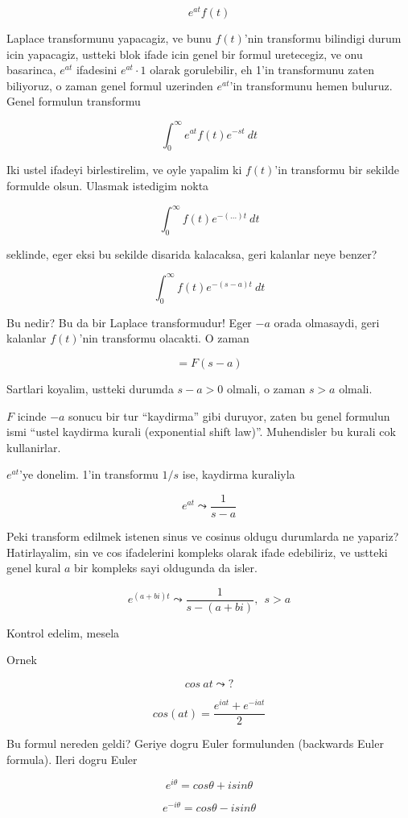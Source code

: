 \documentclass[12pt,fleqn]{article}
\begin{document}
\[ e^{at}f(t) \]

Laplace transformunu yapacagiz, ve bunu $f(t)$'nin transformu bilindigi
durum icin yapacagiz, ustteki blok ifade icin genel bir formul uretecegiz,
ve onu basarinca, $e^{at}$ ifadesini $e^{at} \cdot 1$ olarak gorulebilir, eh
1'in transformunu zaten biliyoruz, o zaman genel formul uzerinden $e^{at}$'in
transformunu hemen buluruz. Genel formulun transformu

\[ \int_0^{\infty} e^{at} f(t)e^{-st} \ dt \]

Iki ustel ifadeyi birlestirelim, ve oyle yapalim ki $f(t)$'in transformu
bir sekilde formulde olsun. Ulasmak istedigim nokta 

\[ \int_0^{\infty} f(t)e^{-( ... )t } \ dt \]

seklinde, eger eksi bu sekilde disarida kalacaksa, geri kalanlar neye
benzer? 

\[ \int_0^{\infty} f(t)e^{-(s-a)t } \ dt \]

Bu nedir? Bu da bir Laplace transformudur! Eger $-a$ orada olmasaydi, geri
kalanlar $f(t)$'nin transformu olacakti. O zaman 

\[ = F(s-a) \]

Sartlari koyalim, ustteki durumda $s-a > 0$ olmali, o zaman $s > a$
olmali. 

$F$ icinde $-a$ sonucu bir tur ``kaydirma'' gibi duruyor, zaten bu genel
formulun ismi ``ustel kaydirma kurali (exponential shift
law)''. Muhendisler bu kurali cok kullanirlar. 

$e^{at}$'ye donelim. 1'in transformu $1/s$ ise, kaydirma kuraliyla

\[ e^{at} \leadsto \frac{1}{s-a} \]

Peki transform edilmek istenen sinus ve cosinus oldugu durumlarda ne
yapariz? Hatirlayalim, sin ve cos ifadelerini kompleks olarak ifade
edebiliriz, ve ustteki genel kural $a$ bir kompleks sayi oldugunda da
isler. 

\[ e^{(a+bi)t} \leadsto \frac{1}{s - (a+bi)}, \ \ s>a  \]

Kontrol edelim, mesela 

Ornek

\[ cos \ at \leadsto ? \]

\[ cos (at) = \frac{e^{iat} + e^{-iat} }{2} \]

Bu formul nereden geldi? Geriye dogru Euler formulunden (backwards Euler
formula). Ileri dogru Euler

\[ e^{i\theta} = cos\theta + isin\theta \]

\[ e^{-i\theta} = cos\theta - isin\theta \]
\end{document}
